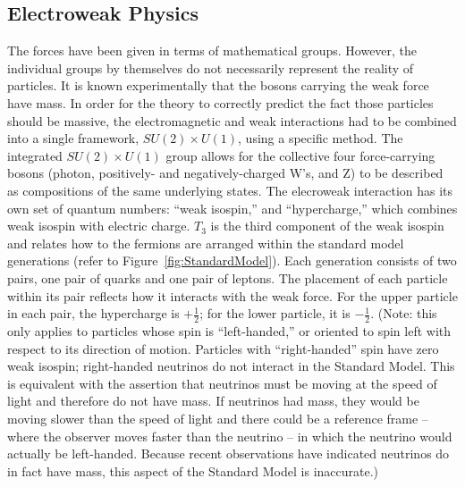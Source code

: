 \subsection{Electroweak Physics}
\label{theory:EWK}
The forces 
have been given in terms 
of mathematical groups.  
However, the individual groups by themselves 
do not necessarily represent the reality of particles.  
It is known experimentally that the bosons carrying 
the weak force have mass.  
In order for the theory to correctly predict the 
fact those particles should be massive, 
the electromagnetic and weak interactions had to be combined 
into a single framework, 
$SU(2) \times U(1)$, using a specific method.  
The integrated $SU(2) \times U(1)$ group 
allows for the collective four force-carrying bosons 
(photon, positively- and negatively-charged W's, and Z) 
to be described as compositions of the same underlying states.  
The elecroweak interaction has its own set of quantum 
numbers: ``weak isospin,'' and ``hypercharge,'' 
which combines weak isospin with electric charge.  
$T_3$ is the third component of the weak isospin 
and relates how to the fermions are arranged 
within the standard model generations 
(refer to Figure~\ref{fig:StandardModel}).  
Each generation consists of two pairs, 
one pair of quarks and one pair of leptons.  
The placement of each particle within its pair 
reflects how it interacts with the weak force.  
For the upper particle in each pair, the hypercharge 
is $+\frac{1}{2}$; 
for the lower particle, it is $-\frac{1}{2}$.  
(Note: this only applies to particles whose spin 
is ``left-handed,'' 
or oriented to spin left with respect to its direction of motion.  
Particles with ``right-handed'' spin have zero weak isospin; 
right-handed neutrinos do not interact in the Standard Model.  
This is equivalent with the assertion that neutrinos 
must be moving at the speed of light and therefore 
do not have mass. 
If neutrinos had mass, 
they would be moving slower than the speed of light 
and there could be a reference frame -- 
where the observer moves faster than the neutrino -- 
in which the neutrino would actually be left-handed.  
Because recent observations have indicated neutrinos %
do in fact have mass, 
this aspect of the Standard Model is inaccurate.)  

